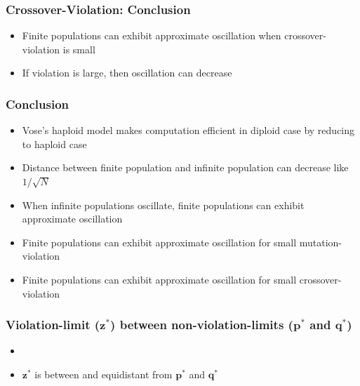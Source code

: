 \documentclass[aspectratio=169]{beamer}
\begin{document}
  \begin{frame}
    \frametitle{Crossover-Violation: Conclusion}
    \begin{itemize}
      \setlength\itemsep{1em}
      \item{Finite populations can exhibit approximate oscillation when crossover-violation is small} 
      \item{If violation is large, then oscillation can decrease}     
      
    \end{itemize}
  \end{frame}
  
  \begin{frame}
    \frametitle{Conclusion}
    \begin{itemize}
      \setlength\itemsep{1em}
      \item{Vose's haploid model makes computation efficient in diploid case by reducing to haploid case} 
      \item{Distance between finite population and infinite population can decrease like $1/\sqrt{N}$}
      \item{When infinite populations oscillate, finite populations can exhibit approximate oscillation}
      \item{Finite populations can exhibit approximate oscillation for small mutation-violation}
      \item{Finite populations can exhibit approximate oscillation for small crossover-violation}      
    \end{itemize}
  \end{frame}
  
  \begin{frame}
    \frametitle{Violation-limit ($\bm{z}^\ast$) between non-violation-limits ($\bm{p}^\ast$ and $\bm{q}^\ast$)}
    \begin{itemize}
      \item 
      \centering
      \item $\bm{z}^\ast$ is between and equidistant from $\bm{p}^\ast$ and $\bm{q}^\ast$
    \end{itemize}
  \end{frame}
  
\end{document}
